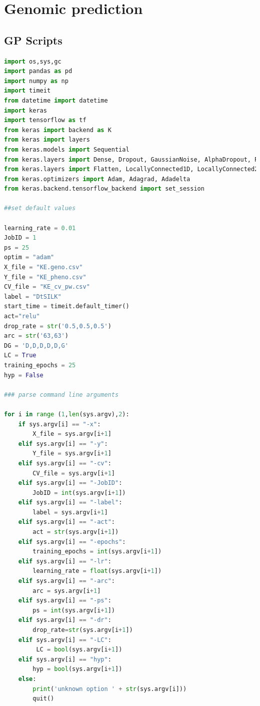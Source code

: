 

\chapter{Genomic prediction} %

\label{AppendixC} %

\section{GP Scripts}
\begin{lstlisting}[language=Python]
import os,sys,gc
import pandas as pd
import numpy as np
import timeit
from datetime import datetime
import keras
import tensorflow as tf
from keras import backend as K
from keras import layers
from keras.models import Sequential
from keras.layers import Dense, Dropout, GaussianNoise, AlphaDropout, Reshape
from keras.layers import Flatten, LocallyConnected1D, LocallyConnected2D
from keras.optimizers import Adam, Adagrad, Adadelta
from keras.backend.tensorflow_backend import set_session 

##set default values

learning_rate = 0.01
JobID = 1
ps = 25
optim = "adam"
X_file = "KE.geno.csv"
Y_file = "KE_pheno.csv"
CV_file = "KE_cv_pw.csv"
label = "DtSILK"
start_time = timeit.default_timer()
act="relu"
drop_rate = str('0.5,0.5,0.5')
arc = str('63,63')
DG = 'D,D,D,D,D,G'
LC = True
training_epochs = 25
hyp = False

### parse command line arguments

for i in range (1,len(sys.argv),2):
    if sys.argv[i] == "-x":
        X_file = sys.argv[i+1]
    elif sys.argv[i] == "-y":
        Y_file = sys.argv[i+1]
    elif sys.argv[i] == "-cv":
        CV_file = sys.argv[i+1]
    elif sys.argv[i] == "-JobID":
        JobID = int(sys.argv[i+1])
    elif sys.argv[i] == "-label":
        label = sys.argv[i+1]
    elif sys.argv[i] == "-act":
        act = str(sys.argv[i+1])
    elif sys.argv[i] == "-epochs":
        training_epochs = int(sys.argv[i+1])
    elif sys.argv[i] == "-lr":
        learning_rate = float(sys.argv[i+1])
    elif sys.argv[i] == "-arc":
        arc = sys.argv[i+1]
    elif sys.argv[i] == "-ps":
        ps = int(sys.argv[i+1])
    elif sys.argv[i] == "-dr":
        drop_rate=str(sys.argv[i+1])
    elif sys.argv[i] == "-LC":
         LC = bool(sys.argv[i+1])
    elif sys.argv[i] == "hyp":
        hyp = bool(sys.argv[i+1])
    else:
        print('unknown option ' + str(sys.argv[i]))
        quit()


\end{lstlisting}

